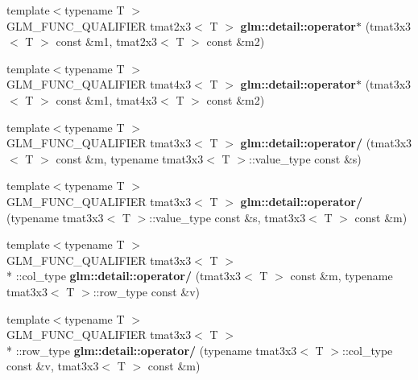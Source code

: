 \begin{DoxyCompactItemize}
\item 
\hypertarget{namespaceglm_1_1detail_a30b3fdb9ba1e8a29bd5fe3d0e3ecfd38}{{\footnotesize template$<$typename T $>$ }\\G\-L\-M\-\_\-\-F\-U\-N\-C\-\_\-\-Q\-U\-A\-L\-I\-F\-I\-E\-R tmat2x3$<$ T $>$ {\bfseries glm\-::detail\-::operator$\ast$} (tmat3x3$<$ T $>$ const \&m1, tmat2x3$<$ T $>$ const \&m2)}\label{namespaceglm_1_1detail_a30b3fdb9ba1e8a29bd5fe3d0e3ecfd38}

\item 
\hypertarget{namespaceglm_1_1detail_a041563813c0c18989cfc4fd64f69cff1}{{\footnotesize template$<$typename T $>$ }\\G\-L\-M\-\_\-\-F\-U\-N\-C\-\_\-\-Q\-U\-A\-L\-I\-F\-I\-E\-R tmat4x3$<$ T $>$ {\bfseries glm\-::detail\-::operator$\ast$} (tmat3x3$<$ T $>$ const \&m1, tmat4x3$<$ T $>$ const \&m2)}\label{namespaceglm_1_1detail_a041563813c0c18989cfc4fd64f69cff1}

\item 
\hypertarget{namespaceglm_1_1detail_ab4c968d521892c340f090b598160d005}{{\footnotesize template$<$typename T $>$ }\\G\-L\-M\-\_\-\-F\-U\-N\-C\-\_\-\-Q\-U\-A\-L\-I\-F\-I\-E\-R tmat3x3$<$ T $>$ {\bfseries glm\-::detail\-::operator/} (tmat3x3$<$ T $>$ const \&m, typename tmat3x3$<$ T $>$\-::value\-\_\-type const \&s)}\label{namespaceglm_1_1detail_ab4c968d521892c340f090b598160d005}

\item 
\hypertarget{namespaceglm_1_1detail_a9f064c716ea2ae07f2c95d0b25809ad7}{{\footnotesize template$<$typename T $>$ }\\G\-L\-M\-\_\-\-F\-U\-N\-C\-\_\-\-Q\-U\-A\-L\-I\-F\-I\-E\-R tmat3x3$<$ T $>$ {\bfseries glm\-::detail\-::operator/} (typename tmat3x3$<$ T $>$\-::value\-\_\-type const \&s, tmat3x3$<$ T $>$ const \&m)}\label{namespaceglm_1_1detail_a9f064c716ea2ae07f2c95d0b25809ad7}

\item 
\hypertarget{namespaceglm_1_1detail_ac5bacf2063ce5a377650afe09360cec0}{{\footnotesize template$<$typename T $>$ }\\G\-L\-M\-\_\-\-F\-U\-N\-C\-\_\-\-Q\-U\-A\-L\-I\-F\-I\-E\-R tmat3x3$<$ T $>$\\*
\-::col\-\_\-type {\bfseries glm\-::detail\-::operator/} (tmat3x3$<$ T $>$ const \&m, typename tmat3x3$<$ T $>$\-::row\-\_\-type const \&v)}\label{namespaceglm_1_1detail_ac5bacf2063ce5a377650afe09360cec0}

\item 
\hypertarget{namespaceglm_1_1detail_a49ba26f5b406e850cadd61cbfb5cbe0b}{{\footnotesize template$<$typename T $>$ }\\G\-L\-M\-\_\-\-F\-U\-N\-C\-\_\-\-Q\-U\-A\-L\-I\-F\-I\-E\-R tmat3x3$<$ T $>$\\*
\-::row\-\_\-type {\bfseries glm\-::detail\-::operator/} (typename tmat3x3$<$ T $>$\-::col\-\_\-type const \&v, tmat3x3$<$ T $>$ const \&m)}\label{namespaceglm_1_1detail_a49ba26f5b406e850cadd61cbfb5cbe0b}


\end{DoxyCompactItemize}
